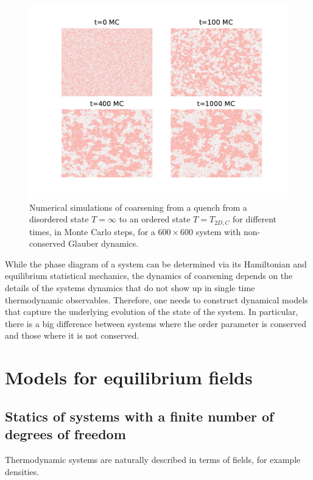 \begin{figure}[t]
    \centering
    \includegraphics[width=\linewidth]{intro/clusterization.pdf}
    \caption{Numerical simulations of coarsening from a quench from a disordered state $T=\infty$ to an ordered state $T=T_{2D,C}$ \cite{onsager_crystal_1944} for different times, in Monte Carlo steps, for a $600 \times 600$ system with non-conserved Glauber dynamics.}
    \label{clusterization}
\end{figure}

While the phase diagram of a system can be determined via its Hamiltonian and equilibrium statistical mechanics, the dynamics of coarsening depends on the details of the systems dynamics that do not show up in single time thermodynamic observables. Therefore, one needs to construct dynamical models that capture the underlying evolution of the state of the system. In particular, there is a big difference between systems where the order parameter is conserved and those where it is not conserved.
    \section{Models for equilibrium fields}

    \subsection{Statics of systems with a finite number of degrees of freedom}


Thermodynamic systems are naturally described in terms of fields, for example densities. 

